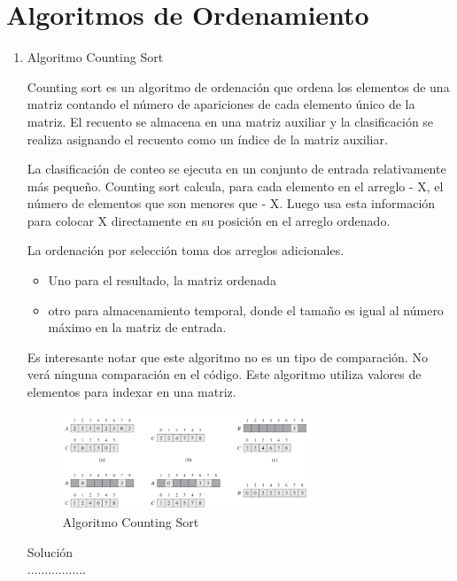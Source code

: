 \documentclass{article}
\begin{document}
	\section{Algoritmos de Ordenamiento}\label{sec:ejercicios}
	\begin{enumerate}
		\item Algoritmo Counting Sort
		
			Counting sort es un algoritmo de ordenación que ordena los elementos de una matriz contando el número de apariciones de cada elemento único de la matriz. El recuento se almacena en una matriz auxiliar y la clasificación se realiza asignando el recuento como un índice de la matriz auxiliar.
			
La clasificación de conteo se ejecuta en un conjunto de entrada relativamente más pequeño. Counting sort calcula, para cada elemento en el arreglo - X, el número de elementos que son menores que - X. Luego usa esta información para colocar X directamente en su posición en el arreglo ordenado.

La ordenación por selección toma dos arreglos adicionales.

\begin{itemize}
   \item Uno para el resultado, la matriz ordenada
   \item otro para almacenamiento temporal, donde el tamaño es   igual al número máximo en la matriz de entrada.
 \end{itemize}	
 
 Es interesante notar que este algoritmo no es un tipo de comparación. No verá ninguna comparación en el código. Este algoritmo utiliza valores de elementos para indexar en una matriz.
		
\begin{figure}[H]
\centering
\includegraphics[width=0.7\textwidth]{img/CountS}
\caption{Algoritmo Counting Sort}
\label{fig:CountS}
\end{figure}


		
		Solución \\
		.................
		

\end{enumerate}
\end{document}
